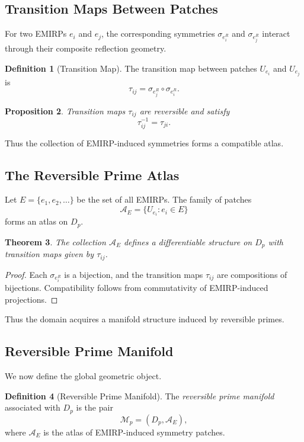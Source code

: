\documentclass[11pt]{article}
\theoremstyle{definition}
\newtheorem{definition}{Definition}[section]
\theoremstyle{plain}
\newtheorem{theorem}[definition]{Theorem}
\newtheorem{proposition}[definition]{Proposition}
\theoremstyle{remark}
\begin{document}
\subsection{Transition Maps Between Patches}

For two EMIRPs $e_i$ and $e_j$, the corresponding symmetries
$\sigma_{e_i^R}$ and $\sigma_{e_j^R}$ interact through their composite
reflection geometry.

\begin{definition}[Transition Map]
The transition map between patches $U_{e_i}$ and $U_{e_j}$ is
\[
\tau_{ij} = \sigma_{e_j^R} \circ \sigma_{e_i^R}.
\]
\end{definition}

\begin{proposition}
Transition maps $\tau_{ij}$ are reversible and satisfy
\[
\tau_{ij}^{-1} = \tau_{ji}.
\]
\end{proposition}

Thus the collection of EMIRP-induced symmetries forms a compatible
atlas.

\subsection{The Reversible Prime Atlas}

Let $E = \{e_1, e_2, \dots\}$ be the set of all EMIRPs. The family of
patches
\[
\mathcal{A}_E = \{U_{e_i} : e_i \in E\}
\]
forms an atlas on $D_p$.

\begin{theorem}
The collection $\mathcal{A}_E$ defines a differentiable structure on
$D_p$ with transition maps given by $\tau_{ij}$.
\end{theorem}

\begin{proof}
Each $\sigma_{e_i^R}$ is a bijection, and the transition maps
$\tau_{ij}$ are compositions of bijections. Compatibility follows from
commutativity of EMIRP-induced projections.
\end{proof}

Thus the domain acquires a manifold structure induced by reversible
primes.

\subsection{Reversible Prime Manifold}

We now define the global geometric object.

\begin{definition}[Reversible Prime Manifold]
The \emph{reversible prime manifold} associated with $D_p$ is the pair
\[
\mathcal{M}_p = (D_p, \mathcal{A}_E),
\]
where $\mathcal{A}_E$ is the atlas of EMIRP-induced symmetry patches.
\end{definition}
\end{document}

